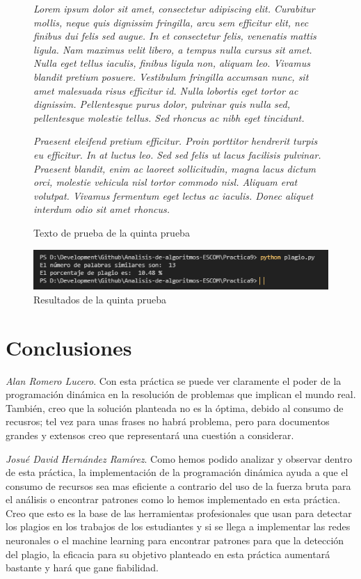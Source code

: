 \documentclass[12pt,twoside]{article}
\begin{document}
\begin{figure}
    \centering
    \textit{Lorem ipsum dolor sit amet, consectetur adipiscing elit. 
Curabitur mollis, neque quis dignissim fringilla, arcu sem 
efficitur elit, nec finibus dui felis sed augue. In et consectetur 
felis, venenatis mattis ligula. Nam maximus velit libero, a tempus nulla 
cursus sit amet. Nulla eget tellus iaculis, finibus ligula non, 
aliquam leo. Vivamus blandit pretium posuere. Vestibulum fringilla 
accumsan nunc, sit amet malesuada risus efficitur id. Nulla 
lobortis eget tortor ac dignissim. Pellentesque purus dolor, 
pulvinar quis nulla sed, pellentesque molestie tellus. Sed rhoncus 
ac nibh eget tincidunt.}

\textit{Praesent eleifend pretium efficitur. Proin porttitor hendrerit 
turpis eu efficitur. In at luctus leo. Sed sed felis ut lacus 
facilisis pulvinar. Praesent blandit, enim ac laoreet sollicitudin, 
magna lacus dictum orci, molestie vehicula nisl tortor commodo nisl. 
Aliquam erat volutpat. Vivamus fermentum eget lectus ac iaculis. 
Donec aliquet interdum odio sit amet rhoncus.}
    \caption{Texto de prueba de la quinta prueba}
    \label{fig:texto52}
\end{figure}

\begin{figure}[ht]
    \centering
    \includegraphics[width=1\textwidth]{5.png}
    \caption{Resultados de la quinta prueba} 
    \label{fig:quinta}
\end{figure}

\newpage
\section{Conclusiones}
\textit{Alan Romero Lucero}. Con esta pr\'actica se puede ver claramente el poder de la programaci\'on din\'amica en la resoluci\'on de problemas que implican el mundo real. Tambi\'en, creo que la soluci\'on planteada no es la \'optima, debido al consumo de recusros; tel vez para unas frases no habr\'a problema, pero para documentos grandes y extensos creo que representar\'a una cuesti\'on a considerar.
\newline\newline

\textit{Josu\'e David Hern\'andez Ram\'irez}. Como hemos podido analizar y observar dentro de esta pr\'actica, la implementaci\'on de la programaci\'on din\'amica ayuda a que el consumo de recursos sea mas eficiente a contrario del uso de la fuerza bruta para el an\'alisis o encontrar patrones como lo hemos implementado en esta pr\'actica.
\newline\newline
Creo que esto es la base de las herramientas profesionales que usan para detectar los plagios en los trabajos de los estudiantes y si se llega a implementar las redes neuronales o el machine learning para encontrar patrones para que la detecci\'on del plagio, la eficacia para su objetivo planteado en esta pr\'actica aumentar\'a bastante y har\'a que gane fiabilidad.
\end{document}
